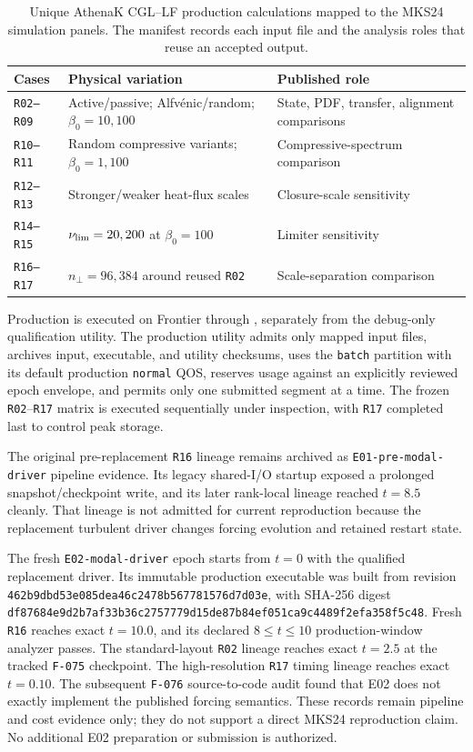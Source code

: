 \documentclass[11pt]{article}
\begin{document}
\begin{table}[htbp]
\centering
\small
\begin{tabular}{p{}p{}p{}}
\toprule
Cases & Physical variation & Published role \\
\midrule
\texttt{R02--R09} & Active/passive; Alfv\'enic/random; \(\beta_0=10,100\)
  & State, PDF, transfer, alignment comparisons \\
\texttt{R10--R11} & Random compressive variants; \(\beta_0=1,100\)
  & Compressive-spectrum comparison \\
\texttt{R12--R13} & Stronger/weaker heat-flux scales
  & Closure-scale sensitivity \\
\texttt{R14--R15} & \(\nu_{\rm lim}=20,200\) at \(\beta_0=100\)
  & Limiter sensitivity \\
\texttt{R16--R17} & \(n_\perp=96,384\) around reused \texttt{R02}
  & Scale-separation comparison \\
\bottomrule
\end{tabular}
\caption{Unique AthenaK CGL--LF production calculations mapped to the MKS24
simulation panels.  The manifest records each input file and the analysis
roles that reuse an accepted output.}
\end{table}

Production is executed on Frontier through
, separately from the debug-only
qualification utility.  The production utility admits only mapped input
files, archives input, executable, and utility checksums, uses the \texttt{batch}
partition with its default production \texttt{normal} QOS, reserves usage
against an explicitly reviewed epoch envelope, and permits only one submitted
segment at a time.  The frozen \texttt{R02}--\texttt{R17} matrix is executed
sequentially under inspection, with \texttt{R17} completed last to control
peak storage.

The original pre-replacement \texttt{R16} lineage remains archived as
\texttt{E01-pre-modal-driver} pipeline evidence.  Its legacy shared-I/O
startup exposed a prolonged snapshot/checkpoint write, and its later
rank-local lineage reached \(t=8.5\) cleanly.  That lineage is not admitted
for current reproduction because the replacement turbulent driver changes
forcing evolution and retained restart state.

The fresh \texttt{E02-modal-driver} epoch starts from \(t=0\) with the
qualified replacement driver.  Its immutable production executable was built
from revision
\texttt{462b9dbd53e085dea46c2478b567781576d7d03e}, with SHA-256 digest
\texttt{df87684e9d2b7af33b36c2757779d15de87b84ef051ca9c4489f2efa358f5c48}.
Fresh \texttt{R16} reaches exact \(t=10.0\), and its declared
\(8\leq t\leq10\) production-window analyzer passes.  The standard-layout
\texttt{R02} lineage reaches exact \(t=2.5\) at the tracked
\texttt{F-075} checkpoint.  The high-resolution \texttt{R17} timing lineage
reaches exact \(t=0.10\).  The subsequent \texttt{F-076} source-to-code audit
found that E02 does not exactly implement the published forcing semantics.
These records remain pipeline and cost evidence only; they do not support a
direct MKS24 reproduction claim.  No additional E02 preparation or submission
is authorized.
\end{document}
